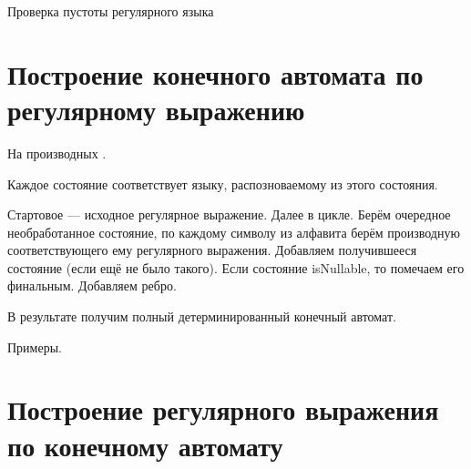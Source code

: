 Проверка пустоты регулярного языка


\section{Построение конечного автомата по регулярному выражению}
 
На производных%
.

Каждое состояние соответствует языку, распозноваемому из этого состояния.

Стартовое --- исходное регулярное выражение. Далее в цикле. 
Берём очередное необработанное состояние, по каждому символу из алфавита берём производную соответствующего ему регулярного выражения.
Добавляем получившееся состояние (если ещё не было такого).
Если состояние isNullable, то помечаем его финальным.
Добавляем ребро.

В результате получим полный детерминированный конечный автомат.  

Примеры.


\section{Построение регулярного выражения по конечному автомату}

